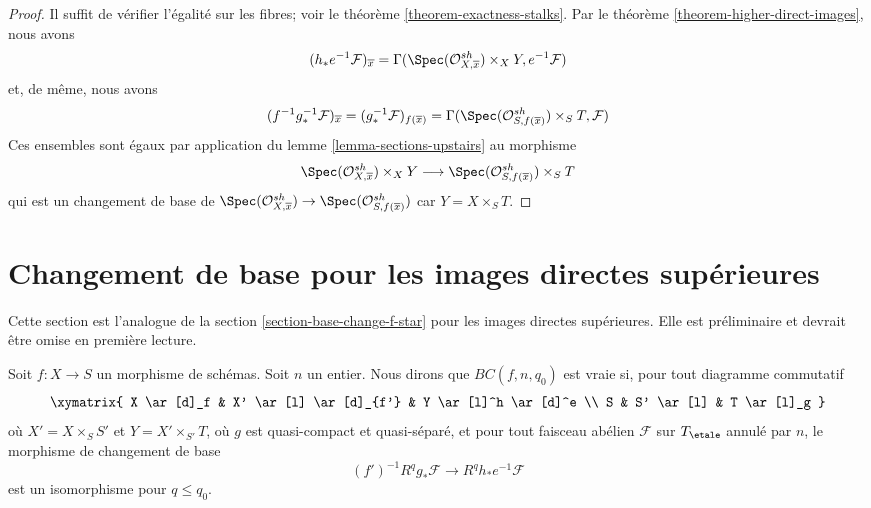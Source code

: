 \begin{proof}
Il suffit de vérifier l'égalité sur les fibres; voir le
théorème \ref{theorem-exactness-stalks}.
Par le théorème \ref{theorem-higher-direct-images}, nous avons
$$
(h_*e^{-1}\mathcal{F})_{\overline{x}} =
\Gamma(\Spec(\mathcal{O}_{X, \overline{x}}^{sh}) \times_X Y, e^{-1}\mathcal{F})
$$
et, de même, nous avons
$$
(f^{-1}g_*^{-1}\mathcal{F})_{\overline{x}} =
(g_*^{-1}\mathcal{F})_{f(\overline{x})} =
\Gamma(\Spec(\mathcal{O}_{S, f(\overline{x})}^{sh}) \times_S T, \mathcal{F})
$$
Ces ensembles sont égaux par application du lemme \ref{lemma-sections-upstairs}
au morphisme
$$
\Spec(\mathcal{O}_{X, \overline{x}}^{sh}) \times_X Y
\longrightarrow
\Spec(\mathcal{O}_{S, f(\overline{x})}^{sh}) \times_S T
$$
qui est un changement de base de
$\Spec(\mathcal{O}_{X, \overline{x}}^{sh}) \to
\Spec(\mathcal{O}_{S, f(\overline{x})}^{sh})$
car $Y = X \times_S T$.
\end{proof}







\section{Changement de base pour les images directes supérieures}
\label{section-base-change}

\noindent
Cette section est l'analogue de la section \ref{section-base-change-f-star}
pour les images directes supérieures.
Elle est préliminaire et devrait être omise en première lecture.

\begin{remark}
\label{remark-base-change-holds}
Soit $f : X \to S$ un morphisme de schémas. Soit $n$ un entier.
Nous dirons que $BC(f, n, q_0)$ est vraie si, pour tout diagramme commutatif
$$
\xymatrix{
X \ar[d]_f & X' \ar[l] \ar[d]_{f'} & Y \ar[l]^h \ar[d]^e \\
S & S' \ar[l] & T \ar[l]_g
}
$$
où $X' = X \times_S S'$ et $Y = X' \times_{S'} T$, où
$g$ est quasi-compact et quasi-séparé, et pour tout faisceau abélien
$\mathcal{F}$ sur $T_\etale$ annulé par $n$, le morphisme de changement de base
$$
(f')^{-1}R^qg_*\mathcal{F}
\longrightarrow
R^qh_*e^{-1}\mathcal{F}
$$
est un isomorphisme pour $q \leq q_0$.
\end{remark}


